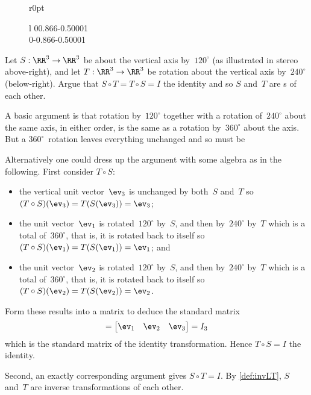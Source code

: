 \begin{wrapfigure}[12]r{0pt}
\begin{tabular}l
0{0.866}{-0.5}0001
\\
0{-0.866}{-0.5}0001
\end{tabular}
\end{wrapfigure}
\begin{example}  
Let \(S:\RR^3\to\RR^3\) be  about the vertical axis by~\(120^\circ\) (as illustrated in stereo above-right), 
and let \(T:\RR^3\to\RR^3\) be rotation about the vertical axis by~\(240^\circ\) (below-right).
Argue that \(S\circ T=T\circ S=I\) the identity and so \(S\) 
and~\(T\) are s of each other.

\begin{solution} 
A basic argument is that rotation by~\(120^\circ\) together with a rotation of~\(240^\circ\) about the same axis, in either order, is the same as a rotation by~\(360^\circ\) about the axis.
But a \(360^\circ\)~rotation leaves everything unchanged and so must be 

Alternatively one could dress up the argument with some algebra as in the following.
First consider \(T\circ S\):
\begin{itemize}
\item the vertical unit vector~\(\ev_3\) is unchanged by both~\(S\) and~\(T\) so \((T\circ S)(\ev_3)=T(S(\ev_3))=\ev_3\);
\item the unit vector~\(\ev_1\) is rotated~\(120^\circ\) by~\(S\), and then by~\(240^\circ\) by~\(T\) which is a total of~\(360^\circ\), that is, it is rotated back to itself so \((T\circ S)(\ev_1)=T(S(\ev_1))=\ev_1\); and
\item the unit vector~\(\ev_2\) is rotated~\(120^\circ\) by~\(S\), and then by~\(240^\circ\) by~\(T\) which is a total of~\(360^\circ\), that is, it is rotated back to itself so \((T\circ S)(\ev_2)=T(S(\ev_2))=\ev_2\).
\end{itemize}
Form these results into a matrix to deduce the standard matrix
\begin{equation*}
[T\circ S]=\begin{bmatrix} \ev_1&\ev_2&\ev_3 \end{bmatrix}
=I_3
\end{equation*}
which is the standard matrix of the identity transformation.
Hence \(T\circ S=I\) the identity.

Second, an exactly corresponding argument gives  \(S\circ T=I\).
By \cref{def:invLT}, \(S\) and~\(T\) are inverse transformations of each other.
\end{solution}
\end{example}

